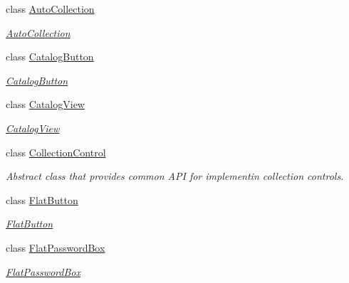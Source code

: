\begin{DoxyCompactItemize}
\item 
class \mbox{\hyperlink{class_wpf_handler_1_1_u_i_1_1_controls_1_1_auto_collection}{Auto\+Collection}}
\begin{DoxyCompactList}\small\item\em \mbox{\hyperlink{class_wpf_handler_1_1_u_i_1_1_controls_1_1_auto_collection}{Auto\+Collection}} \end{DoxyCompactList}\item 
class \mbox{\hyperlink{class_wpf_handler_1_1_u_i_1_1_controls_1_1_catalog_button}{Catalog\+Button}}
\begin{DoxyCompactList}\small\item\em \mbox{\hyperlink{class_wpf_handler_1_1_u_i_1_1_controls_1_1_catalog_button}{Catalog\+Button}} \end{DoxyCompactList}\item 
class \mbox{\hyperlink{class_wpf_handler_1_1_u_i_1_1_controls_1_1_catalog_view}{Catalog\+View}}
\begin{DoxyCompactList}\small\item\em \mbox{\hyperlink{class_wpf_handler_1_1_u_i_1_1_controls_1_1_catalog_view}{Catalog\+View}} \end{DoxyCompactList}\item 
class \mbox{\hyperlink{class_wpf_handler_1_1_u_i_1_1_controls_1_1_collection_control}{Collection\+Control}}
\begin{DoxyCompactList}\small\item\em Abstract class that provides common A\+PI for implementin collection controls. \end{DoxyCompactList}\item 
class \mbox{\hyperlink{class_wpf_handler_1_1_u_i_1_1_controls_1_1_flat_button}{Flat\+Button}}
\begin{DoxyCompactList}\small\item\em \mbox{\hyperlink{class_wpf_handler_1_1_u_i_1_1_controls_1_1_flat_button}{Flat\+Button}} \end{DoxyCompactList}\item 
class \mbox{\hyperlink{class_wpf_handler_1_1_u_i_1_1_controls_1_1_flat_password_box}{Flat\+Password\+Box}}
\begin{DoxyCompactList}\small\item\em \mbox{\hyperlink{class_wpf_handler_1_1_u_i_1_1_controls_1_1_flat_password_box}{Flat\+Password\+Box}} \end{DoxyCompactList}\item 

\end{DoxyCompactItemize}
